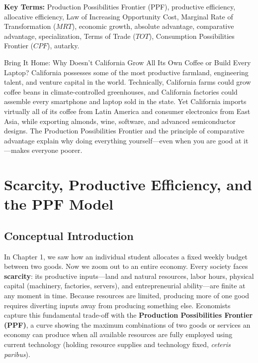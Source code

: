 \documentclass[11pt,letterpaper]{article}
\begin{document}
\noindent\textbf{Key Terms:} Production Possibilities Frontier (PPF), productive efficiency, allocative efficiency, Law of Increasing Opportunity Cost, Marginal Rate of Transformation ($MRT$), economic growth, absolute advantage, comparative advantage, specialization, Terms of Trade ($TOT$), Consumption Possibilities Frontier ($CPF$), autarky.

\begin{examplecase}{Bring It Home: Why Doesn't California Grow All Its Own Coffee or Build Every Laptop?}
California possesses some of the most productive farmland, engineering talent, and venture capital in the world. Technically, California farms could grow coffee beans in climate-controlled greenhouses, and California factories could assemble every smartphone and laptop sold in the state. Yet California imports virtually all of its coffee from Latin America and consumer electronics from East Asia, while exporting almonds, wine, software, and advanced semiconductor designs. The Production Possibilities Frontier and the principle of comparative advantage explain why doing everything yourself—even when you are good at it—makes everyone poorer.
\end{examplecase}

\section{Scarcity, Productive Efficiency, and the PPF Model}

\subsection*{Conceptual Introduction}
In Chapter 1, we saw how an individual student allocates a fixed weekly budget between two goods. Now we zoom out to an entire economy. Every society faces \textbf{scarcity}: its productive inputs—land and natural resources, labor hours, physical capital (machinery, factories, servers), and entrepreneurial ability—are finite at any moment in time. Because resources are limited, producing more of one good requires diverting inputs away from producing something else. Economists capture this fundamental trade-off with the \textbf{Production Possibilities Frontier (PPF)}, a curve showing the maximum combinations of two goods or services an economy can produce when all available resources are fully employed using current technology (holding resource supplies and technology fixed, \emph{ceteris paribus}).
\end{document}
